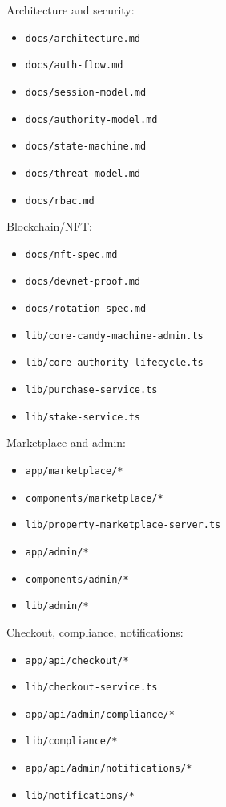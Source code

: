 \documentclass[
  10pt,
  letterpaper,
]{article}
\providecommand{\tightlist}{%
  \setlength{\itemsep}{0pt}\setlength{\parskip}{0pt}}
\let\oldtexttt\texttt
\renewcommand{\texttt}[1]{\oldtexttt{\small #1}}
\begin{document}
Architecture and security:

\begin{itemize}
\tightlist
\item
  \texttt{docs/architecture.md}
\item
  \texttt{docs/auth-flow.md}
\item
  \texttt{docs/session-model.md}
\item
  \texttt{docs/authority-model.md}
\item
  \texttt{docs/state-machine.md}
\item
  \texttt{docs/threat-model.md}
\item
  \texttt{docs/rbac.md}
\end{itemize}

Blockchain/NFT:

\begin{itemize}
\tightlist
\item
  \texttt{docs/nft-spec.md}
\item
  \texttt{docs/devnet-proof.md}
\item
  \texttt{docs/rotation-spec.md}
\item
  \texttt{lib/core-candy-machine-admin.ts}
\item
  \texttt{lib/core-authority-lifecycle.ts}
\item
  \texttt{lib/purchase-service.ts}
\item
  \texttt{lib/stake-service.ts}
\end{itemize}

Marketplace and admin:

\begin{itemize}
\tightlist
\item
  \texttt{app/marketplace/*}
\item
  \texttt{components/marketplace/*}
\item
  \texttt{lib/property-marketplace-server.ts}
\item
  \texttt{app/admin/*}
\item
  \texttt{components/admin/*}
\item
  \texttt{lib/admin/*}
\end{itemize}

Checkout, compliance, notifications:

\begin{itemize}
\tightlist
\item
  \texttt{app/api/checkout/*}
\item
  \texttt{lib/checkout-service.ts}
\item
  \texttt{app/api/admin/compliance/*}
\item
  \texttt{lib/compliance/*}
\item
  \texttt{app/api/admin/notifications/*}
\item
  \texttt{lib/notifications/*}
\end{itemize}
\end{document}
